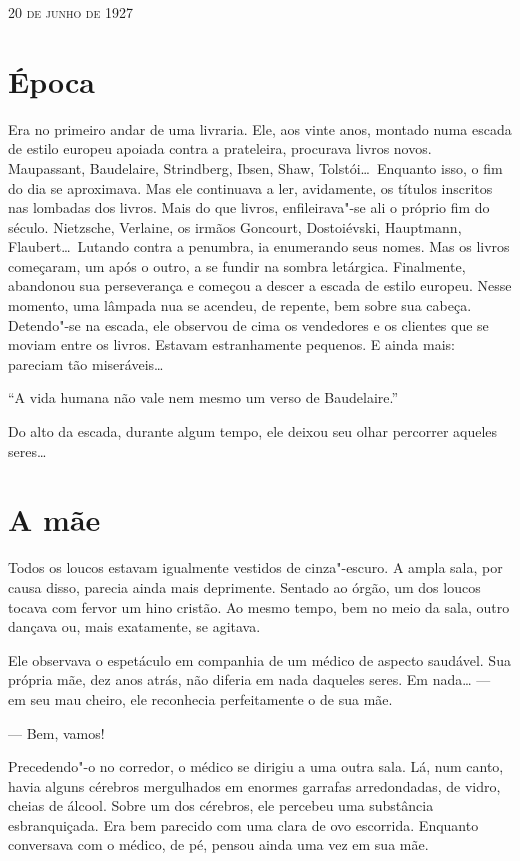 \begin{flushright}
\textsc{20 de junho de 1927}
\end{flushright}

\section{Época}

Era no primeiro andar de uma livraria. Ele, aos vinte anos, montado numa
escada de estilo europeu apoiada contra a prateleira, procurava livros
novos. Maupassant, Baudelaire, Strindberg, Ibsen, Shaw, Tolstói\ldots{}\
Enquanto isso, o fim do dia se aproximava. Mas ele continuava a ler,
avidamente, os títulos inscritos nas lombadas dos livros. Mais do que
livros, enfileirava"-se ali o próprio fim do século. Nietzsche,
Verlaine, os irmãos Goncourt, Dostoiévski, Hauptmann, Flaubert\ldots{}\
Lutando contra a penumbra, ia enumerando seus nomes. Mas os livros
começaram, um após o outro, a se fundir na sombra letárgica.
Finalmente, abandonou sua perseverança e começou a descer a escada de
estilo europeu. Nesse momento, uma lâmpada nua se acendeu, de repente,
bem sobre sua cabeça. Detendo"-se na escada, ele observou de cima os
vendedores e os clientes que se moviam entre os livros. Estavam
estranhamente pequenos. E ainda mais: pareciam tão miseráveis\ldots{}

``A vida humana não vale nem mesmo um verso de Baudelaire.''

Do alto da escada, durante algum tempo, ele deixou seu olhar percorrer
aqueles seres\ldots{}

\section{A mãe}

Todos os loucos estavam igualmente vestidos de cinza"-escuro. A ampla
sala, por causa disso, parecia ainda mais deprimente. Sentado ao órgão,
um dos loucos tocava com fervor um hino cristão. Ao mesmo tempo, bem no
meio da sala, outro dançava ou, mais exatamente, se agitava.

Ele observava o espetáculo em companhia de um médico de aspecto
saudável. Sua própria mãe, dez anos atrás, não diferia em nada daqueles
seres. Em nada\ldots{} --- em seu mau cheiro, ele reconhecia perfeitamente o
de sua mãe.

--- Bem, vamos!

Precedendo"-o no corredor, o médico se dirigiu a uma outra sala. Lá, num
canto, havia alguns cérebros mergulhados em enormes garrafas
arredondadas, de vidro, cheias de álcool. Sobre um dos cérebros, ele
percebeu uma substância esbranquiçada. Era bem parecido com uma clara
de ovo escorrida. Enquanto conversava com o médico, de pé, pensou ainda
uma vez em sua mãe.

